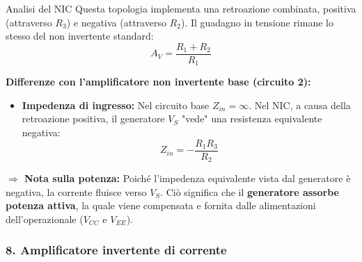 \begin{teorema}{Analisi del NIC}
    Questa topologia implementa una retroazione combinata, positiva (attraverso $R_3$) e negativa (attraverso $R_2$). Il guadagno in tensione rimane lo stesso del non invertente standard:
    \[ A_V = \frac{R_1 + R_2}{R_1} \]
    
    \noindent \textbf{Differenze con l'amplificatore non invertente base (circuito 2):}
    \begin{itemize}[label=$\ast$, leftmargin=*, itemsep=0.1cm, topsep=0.1cm]
        \item \textbf{Impedenza di ingresso:} Nel circuito base $Z_{in} = \infty$. Nel NIC, a causa della retroazione positiva, il generatore $V_S$ "vede" una resistenza equivalente negativa:
        \[ Z_{in} = - \frac{R_1 R_3}{R_2} \]
    \end{itemize}
    \vspace{0.1cm}
    \textcolor{noteteal}{\textbf{$\Rightarrow$ Nota sulla potenza:}} Poiché l'impedenza equivalente vista dal generatore è negativa, la corrente fluisce verso $V_S$. Ciò significa che il \textbf{generatore assorbe potenza attiva}, la quale viene compensata e fornita dalle alimentazioni dell'operazionale ($V_{CC}$ e $V_{EE}$).
\end{teorema}

\vspace{0.4cm}
\subsubsection*{8. Amplificatore invertente di corrente}


